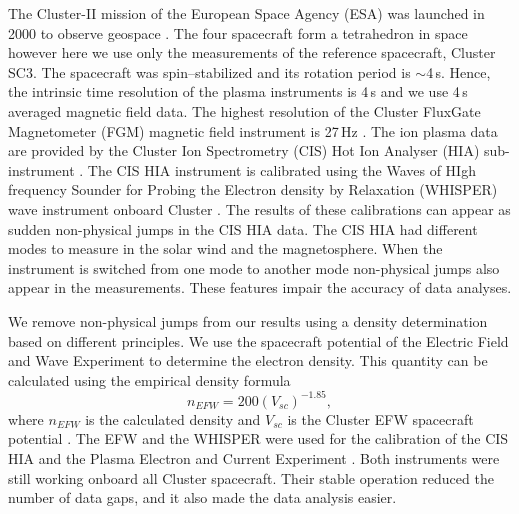 \documentclass[linenumbers,draft]{agujournal}
\begin{document}
The Cluster-II mission of the European Space Agency (ESA) was launched in 2000 to observe geospace \citep{credland97:_clust_mission,escoubet01:_introd_clust}. The four spacecraft form a tetrahedron in space however here we use only the measurements of the reference spacecraft, Cluster SC3. The spacecraft was spin--stabilized and its rotation period is $\sim$4\,s. Hence, the intrinsic time resolution of the plasma instruments is 4\,s and we use 4\,s averaged magnetic field data. The highest resolution of the Cluster FluxGate Magnetometer (FGM) magnetic field instrument is 27\,Hz \citep{balogh97:_clust_magnet_field_inves,balogh01:_clust_magnet_field_inves}. The ion plasma data are provided by the Cluster Ion Spectrometry (CIS) Hot Ion Analyser (HIA) sub-instrument \citep{reme97:_clust_ion_spect_exper,reme01:_first_earth_clust_cis}. The CIS HIA instrument is calibrated using the Waves of HIgh frequency Sounder for Probing the Electron density by Relaxation (WHISPER) wave instrument onboard Cluster \citep{decreau01:_early_whisp_clust,trotignon10:_whisp_relax_sound_clust_activ_archiv,blagau13:_in_hot_ion_analy_clust,blagau14:_in_hot_ion_analy_clust}. The results of these calibrations can appear as sudden non-physical jumps in the CIS HIA data. The CIS HIA had different modes to measure in the solar wind and the magnetosphere. When the instrument is switched from one mode to another mode non-physical jumps also appear in the measurements. These features impair the accuracy of data analyses.

We remove non-physical jumps from our results using a density determination based on different principles. We use the spacecraft potential of the Electric Field and Wave Experiment \citep[EFW ;][]{gustafsson97:_elect_field_wave_exper_clust_mission,gustafsson01:_first_clust_efw} to determine the electron density. This quantity can be calculated using the empirical density formula 
\begin{equation}\label{eq:empdens}
n_{EFW}=200(V_{sc})^{-1.85},
\end{equation}
where $n_{EFW}$ is the calculated density and $V_{sc}$ is the Cluster EFW spacecraft potential \citep{trotignon10:_whisp_relax_sound_clust_activ_archiv,trotignon11:_calib_repor_whisp_measur_clust}. The EFW and the WHISPER were used for the calibration of the CIS HIA and the Plasma Electron and Current Experiment \citep[PEACE;][]{johnstone97:_peace,fazakerley10:_peace_data_clust_activ_archiv,fazakerley10:_clust_peace_in_calib_status}. Both instruments were still working onboard all Cluster spacecraft. Their stable operation reduced the number of data gaps, and it also made the data analysis easier.
\end{document}

